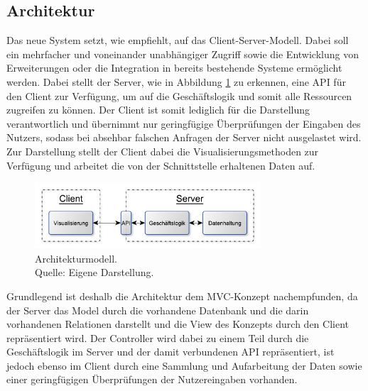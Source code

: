 \subsection{Architektur}

Das neue System setzt, wie \citeauthor{MS-Fielding.} empfiehlt, auf das Client-Server-Modell. Dabei soll ein mehrfacher und voneinander unabhängiger Zugriff sowie die Entwicklung von Erweiterungen oder die Integration in bereits bestehende Systeme ermöglicht werden.
Dabei stellt der Server, wie in Abbildung \ref{img:einkaufBPMN} zu erkennen, eine \ac{API} für den Client zur Verfügung, um auf die Geschäftslogik und somit alle Ressourcen zugreifen zu können.
Der Client ist somit lediglich für die Darstellung verantwortlich und übernimmt nur geringfügige Überprüfungen der Eingaben des Nutzers, sodass bei absehbar falschen Anfragen der Server nicht ausgelastet wird.
Zur Darstellung stellt der Client dabei die Visualisierungsmethoden zur Verfügung und arbeitet die von der Schnittstelle erhaltenen Daten auf.

\begin{figure}[h]
  \centering
  \includegraphics[width=0.75\textwidth]{img/konzeption/gesamtkonzept/Architektur.pdf}
  \captionsetup{format=hang,justification=raggedright,singlelinecheck=false}
  \caption[Architekturmodell]{Architekturmodell. \\Quelle: Eigene Darstellung.}
  \label{img:einkaufBPMN}
\end{figure}

Grundlegend ist deshalb die Architektur dem \ac{MVC}-Konzept nachempfunden, da der Server das Model durch die vorhandene Datenbank und die darin vorhandenen Relationen darstellt und die View des Konzepts durch den Client repräsentiert wird.
Der Controller wird dabei zu einem Teil durch die Geschäftslogik im Server und der damit verbundenen \ac{API} repräsentiert, ist jedoch ebenso im Client durch eine Sammlung und Aufarbeitung der Daten sowie einer geringfügigen Überprüfungen der Nutzereingaben vorhanden.\autocite{rf-leff2001web}

